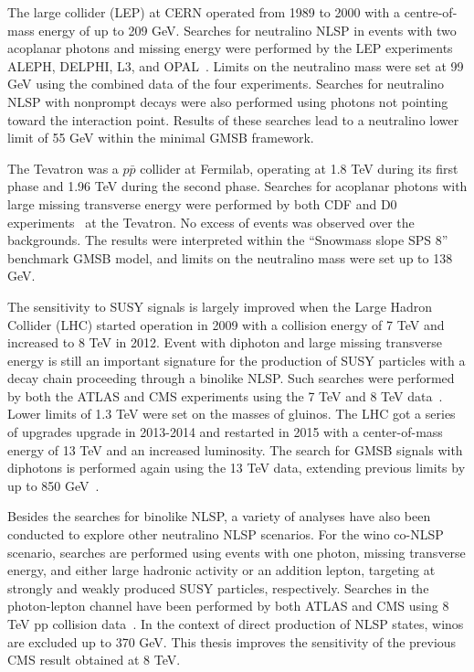 \documentclass[thesis.tex]{subfiles}
\begin{document}
The large \ePeM collider (LEP) at CERN operated from 1989 to 2000 with a centre-of-mass energy of up to 209 GeV. 
Searches for neutralino NLSP in events with two acoplanar photons and missing energy were performed by the LEP experiments ALEPH, DELPHI, L3, and OPAL~\cite{ALEPH,doi:10.1063/1.2735164,DELPHI,OPAL}.
Limits on the neutralino mass were set at 99 GeV using the combined data of the four experiments.
Searches for neutralino NLSP with nonprompt decays were also performed using photons not pointing toward the interaction point.
Results of these searches lead to a neutralino lower limit of 55 GeV within the minimal GMSB framework.

The Tevatron was a $p\bar{p}$ collider at Fermilab, operating at 1.8 TeV during its first phase and 1.96 TeV during the second phase.
Searches for acoplanar photons with large missing transverse energy were performed by both CDF and D0 experiments~\cite{CDFdiphoton,D0diphoton} at the Tevatron.
No excess of events was observed over the backgrounds.
The results were interpreted within the ``Snowmass slope SPS 8'' benchmark GMSB model, and limits on the neutralino mass were set up to 138 GeV. 

The sensitivity to SUSY signals is largely improved when the Large Hadron Collider (LHC) started operation in 2009 with a collision energy of 7 TeV and increased to 8 TeV in 2012.
Event with diphoton and large missing transverse energy is still an important signature for the production of SUSY particles with a decay chain proceeding through a binolike NLSP. 
Such searches were performed by both the ATLAS and CMS experiments using the 7 TeV and 8 TeV data~\cite{ATLASdiphoton7TeV, CMSdiphoton7TeV, CMSdiphoton8TeV,ATLASdiphoton8TeV}.
Lower limits of 1.3 TeV were set on the masses of gluinos.
The LHC got a series of upgrades upgrade in 2013-2014 and restarted in 2015 with a center-of-mass energy of 13 TeV and an increased luminosity.
The search for GMSB signals with diphotons is performed again using the 13 TeV data, extending previous limits by up to 850 GeV~\cite{ATLASdiphoton13TeV}.   

Besides the searches for binolike NLSP, a variety of analyses have also been conducted to explore other neutralino NLSP scenarios. 
For the wino co-NLSP scenario, searches are performed using events with one photon, missing transverse energy, and either large hadronic activity or an addition lepton, targeting at strongly and weakly produced SUSY particles, respectively.
Searches in the photon-lepton channel have been performed by both ATLAS and CMS using 8 TeV pp collision data~\cite{Yutaro}.
In the context of direct production of NLSP states, winos are excluded up to 370 GeV.
This thesis improves the sensitivity of the previous CMS result obtained at 8 TeV.
\end{document}
